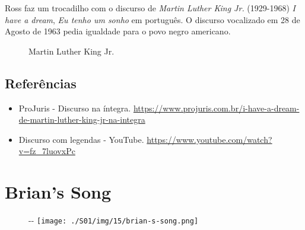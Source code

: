 Ross faz um trocadilho com o discurso de \emph{Martin Luther King Jr.}
(1929-1968) \emph{I have a dream}, \emph{Eu tenho um sonho} em
português. O discurso vocalizado em 28 de Agosto de 1963 pedia igualdade
para o povo negro americano.

\begin{figure}
  \centering
    \caption{Martin Luther King Jr.\label{fig:martin-luther-king-jr}}
\end{figure}

\hypertarget{referuxeancias}{%
\subsection{Referências}\label{referuxeancias}}

\begin{itemize}
\tightlist
\item
  \sloppy ProJuris - Discurso na íntegra. \url{https://www.projuris.com.br/i-have-a-dream-de-martin-luther-king-jr-na-integra}
\item
  \sloppy Discurso com legendas - YouTube. \url{https://www.youtube.com/watch?v=fz_7luovxPc}
\end{itemize}

\hypertarget{brians-song}{%
\section{Brian's Song}\label{brians-song}}

\begin{figure}[!ht]
  \begin{adjustwidth}{-\oddsidemargin-1in}{-\rightmargin}
    \centering
    \texttt{[image: ./S01/img/15/brian-s-song.png]}
  \end{adjustwidth}
\end{figure}

